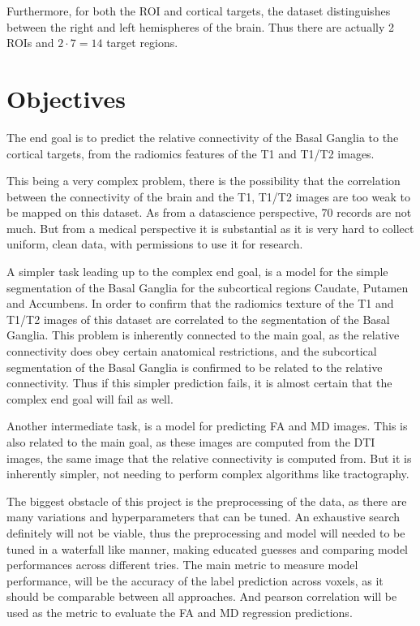 Furthermore, for both the \ac{ROI} and cortical targets, the dataset distinguishes between the right and left hemispheres of the brain. Thus there are actually 2 \ac{ROI}s and $2 \cdot 7=14$ target regions.


\section{Objectives}

The end goal is to predict the relative connectivity of the Basal Ganglia to the cortical targets, from the radiomics features of the T1 and T1/T2 images.\par

This being a very complex problem, there is the possibility that the correlation between the connectivity of the brain and the T1, T1/T2 images are too weak to be mapped on this dataset. As from a datascience perspective, 70 records are not much. But from a medical perspective it is substantial as it is very hard to collect uniform, clean data, with permissions to use it for research.\par

A simpler task leading up to the complex end goal, is a model for the simple segmentation of the Basal Ganglia for the subcortical regions Caudate, Putamen and Accumbens. In order to confirm that the radiomics texture of the T1 and T1/T2 images of this dataset are correlated to the segmentation of the Basal Ganglia. This problem is inherently connected to the main goal, as the relative connectivity does obey certain anatomical restrictions, and the subcortical segmentation of the Basal Ganglia is confirmed to be related to the relative connectivity. Thus if this simpler prediction fails, it is almost certain that the complex end goal will fail as well.\par

Another intermediate task, is a model for predicting \ac{FA} and \ac{MD} images. This is also related to the main goal, as these images are computed from the \ac{DTI} images, the same image that the relative connectivity is computed from. But it is inherently simpler, not needing to perform complex algorithms like tractography.\par

The biggest obstacle of this project is the preprocessing of the data, as there are many variations and hyperparameters that can be tuned. An exhaustive search definitely will not be viable, thus the preprocessing and model will needed to be tuned in a waterfall like manner, making educated guesses and comparing model performances across different tries. The main metric to measure model performance, will be the accuracy of the label prediction across voxels, as it should be comparable between all approaches. And pearson correlation will be used as the metric to evaluate the \ac{FA} and \ac{MD} regression predictions.

